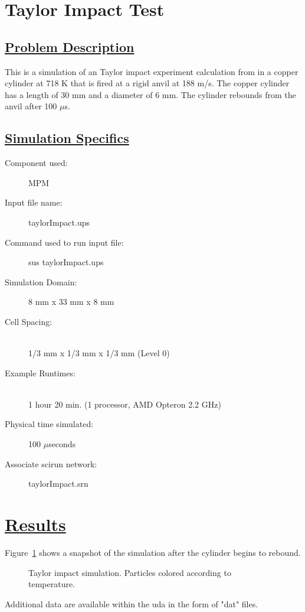 \documentclass[fleqn]{article}
\begin{document}
\section*{\center Taylor Impact Test}
\subsection*{\underline{Problem Description}}
This is a simulation of an Taylor impact experiment calculation from 
\cite{Gust82} in a copper cylinder at 718 K that is fired at a
rigid anvil at 188 m/s.  The copper cylinder has a length of 30 mm and
a diameter of 6 mm.  The cylinder rebounds from the anvil after 100 $\mu$s.
 
\subsection*{\underline{Simulation Specifics}}
\begin{description} 
\item [Component used:] \hfill MPM
\item [Input file name:] \hfill taylorImpact.ups
\item [Command used to run input file:]\hfill sus taylorImpact.ups
\item [Simulation Domain:]\hfill 8 mm x 33 mm x 8 mm

\item [Cell Spacing:]\hfill \\ 
  1/3 mm x 1/3 mm x 1/3 mm (Level 0)

\item [Example Runtimes:] \hfill \\
 1 hour 20 min.   (1 processor, AMD Opteron 2.2 GHz)\\

\item [Physical time simulated:] \hfill 100 $\mu$seconds

\item [Associate scirun network:] \hfill taylorImpact.srn

\end{description}

\section*{\underline{Results}}

Figure~\ref{fig:taylorImpact} shows a snapshot of the simulation after the
cylinder begins to rebound.
\begin{figure}[b]
  \center
  \caption{Taylor impact simulation.  Particles colored according to
           temperature.}
  \label{fig:taylorImpact}
\end{figure}

Additional data are available within the uda in the form of "dat" files.


\end{document}
